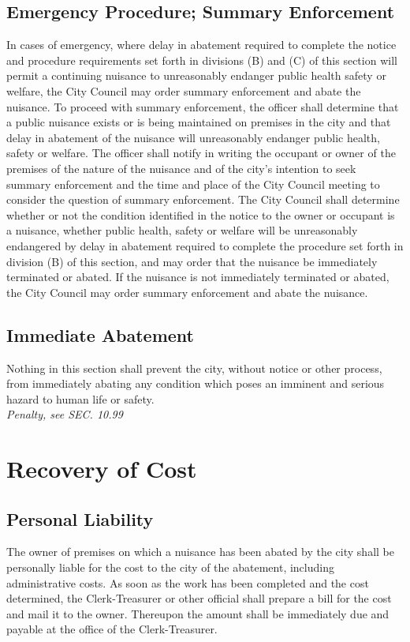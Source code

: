 \documentclass[code.tex]{subfiles}
\begin{document}
\subsection{Emergency Procedure; Summary Enforcement}
In cases of emergency, where delay in abatement required to complete the notice and procedure requirements set forth in divisions (B) and (C) of this section will permit a continuing nuisance to unreasonably endanger public health safety or welfare, the City Council may order summary enforcement and abate the nuisance.  To proceed with summary enforcement, the officer shall determine that a public nuisance exists or is being maintained on premises in the city and that delay in abatement of the nuisance will unreasonably endanger public health, safety or welfare.  The officer shall notify in writing the occupant or owner of the premises of the nature of the nuisance and of the city’s intention to seek summary enforcement and the time and place of the City Council meeting to consider the question of summary enforcement.  The City Council shall determine whether or not the condition identified in the notice to the owner or occupant is a nuisance, whether public health, safety or welfare will be unreasonably endangered by delay in abatement required to complete the procedure set forth in division (B) of this section, and may order that the nuisance be immediately terminated or abated.  If the nuisance is not immediately terminated or abated, the City Council may order summary enforcement and abate the nuisance.
\subsection{Immediate Abatement}
Nothing in this section shall prevent the city, without notice or other process, from immediately abating any condition which poses an imminent and serious hazard to human life or safety.\\
\emph{Penalty, see SEC. 10.99}
\section{Recovery of Cost}
\subsection{Personal Liability}
The owner of premises on which a nuisance has been abated by the city shall be personally liable for the cost to the city of the abatement, including administrative costs.  As soon as the work has been completed and the cost determined, the Clerk-Treasurer or other official shall prepare a bill for the cost and mail it to the owner.  Thereupon the amount shall be immediately due and payable at the office of the Clerk-Treasurer.
\end{document}
